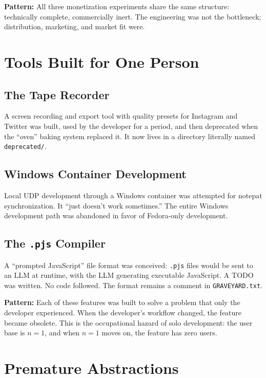 \documentclass[10pt,letterpaper,twocolumn]{article}
\begin{document}
\textbf{Pattern:} All three monetization experiments share the same structure: technically complete, commercially inert. The engineering was not the bottleneck; distribution, marketing, and market fit were.

\section{Tools Built for One Person}

\subsection{The Tape Recorder}

A screen recording and export tool with quality presets for Instagram and Twitter was built, used by the developer for a period, and then deprecated when the ``oven'' baking system replaced it. It now lives in a directory literally named \texttt{deprecated/}.

\subsection{Windows Container Development}

Local UDP development through a Windows container was attempted for notepat synchronization. It ``just doesn't work sometimes.'' The entire Windows development path was abandoned in favor of Fedora-only development.

\subsection{The \texttt{.pjs} Compiler}

A ``prompted JavaScript'' file format was conceived: \texttt{.pjs} files would be sent to an LLM at runtime, with the LLM generating executable JavaScript. A TODO was written. No code followed. The format remains a comment in \texttt{GRAVEYARD.txt}.

\textbf{Pattern:} Each of these features was built to solve a problem that only the developer experienced. When the developer's workflow changed, the feature became obsolete. This is the occupational hazard of solo development: the user base is $n=1$, and when $n=1$ moves on, the feature has zero users.

\section{Premature Abstractions}
\end{document}
